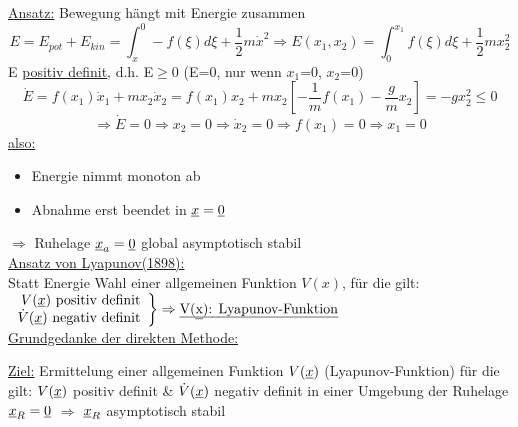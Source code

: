 \documentclass[openany,a4paper,11pt]{book}
\begin{document}
\uline{Ansatz:} Bewegung hängt mit Energie zusammen
\[E=E_{pot}+E_{kin}=\int_x^0 -f(\xi)d\xi+\frac{1}{2}m\dot{x}^2 \Rightarrow E(x_1,x_2)=\int_0^{x_1}f(\xi)d\xi +\frac{1}{2}mx_2^2\]
E \uline{positiv definit}, d.h. E$\ge$0 (E=0, nur wenn $x_1$=0, $x_2$=0)
\[\dot{E}=f(x_1)\dot{x}_1+mx_2\dot{x}_2=f(x_1)x_2+mx_2[-\frac{1}{m}f(x_1)-\frac{g}{m}x_2]=-gx_2^2\le 0\]
\[\Rightarrow \dot{E}=0 \Rightarrow x_2=0\Rightarrow\dot{x}_2=0\Rightarrow f(x_1)=0\Rightarrow x_1=0\]
\uline{also:} \begin{itemize}
    \item Energie nimmt monoton ab
    \item Abnahme erst beendet in $\uline{x}=\uline{0}$
\end{itemize}
$\Rightarrow$ Ruhelage $\uline{x}_a=\uline{0}$ global asymptotisch stabil\\
\uline{Ansatz von Lyapunov(1898):}\\
Statt Energie Wahl einer allgemeinen Funktion $V(x)$, für die gilt:\\
$\left. \begin{array}{r}
    V(\uline{x}) \text{ positiv definit}\\
    \dot{V}(\uline{x}) \text{ negativ definit}\\
    \end{array}
    \right\} \Rightarrow \text{\uline{V(\uline{x}): Lyapunov-Funktion}}$\\
\uline{Grundgedanke der direkten Methode:}\\
\begin{minipage}[c]{\textwidth}
\end{minipage}
\uline{Ziel:} Ermittelung einer allgemeinen Funktion $V(\uline{x})$ (Lyapunov-Funktion) für die gilt: $V(\uline{x})$ positiv definit \& $\dot{V}(\uline{x})$ negativ definit in einer Umgebung der Ruhelage $\uline{x}_R=\uline{0}$ $\Rightarrow$ $\uline{x}_R$ asymptotisch stabil
\end{document}
